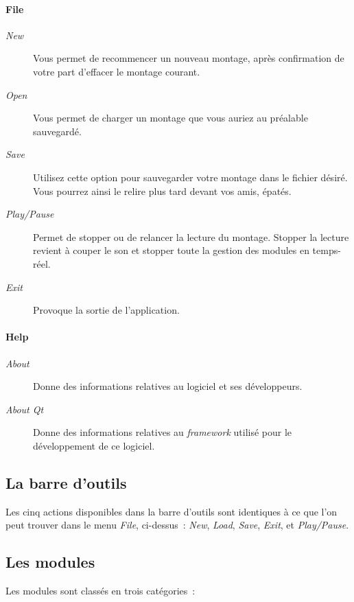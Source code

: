 \documentclass[a4paper,oneside,frenchb,10pt]{article}
\begin{document}
\paragraph{File}
\begin{description}
\item[\emph{New}]
  Vous permet de recommencer un nouveau montage, après
  confirmation de votre part d'effacer le montage courant.
\item[\emph{Open}]
  Vous permet de charger un montage que vous auriez au préalable
  sauvegardé.
\item[\emph{Save}]
  Utilisez cette option pour sauvegarder votre montage dans le
  fichier désiré. Vous pourrez ainsi le relire plus tard devant vos
  amis, épatés.
\item[\emph{Play/Pause}]
  Permet de stopper ou de relancer la lecture du montage.
  Stopper la lecture revient à couper le son et stopper toute la gestion
  des modules en temps-réel.
\item[\emph{Exit}]
  Provoque la sortie de l'application.
\end{description}

\paragraph{Help}
\begin{description}
\item[\emph{About}]
  Donne des informations relatives au logiciel et ses
  développeurs.
\item[\emph{About Qt}]
  Donne des informations relatives au \emph{framework} utilisé pour
  le développement de ce logiciel.
\end{description}

\subsection{La barre d'outils}

Les cinq actions disponibles dans la barre d'outils sont identiques à ce
que l'on peut trouver dans le menu \emph{File}, ci-dessus~: \emph{New}, \emph{Load}, \emph{Save},
\emph{Exit}, et \emph{Play/Pause}.

\subsection{Les modules}

Les modules sont classés en trois catégories~:
\end{document}
